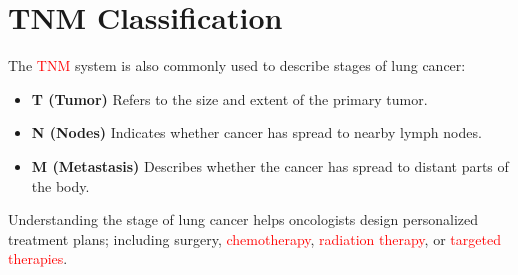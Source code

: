 \section{TNM Classification} 
The \textcolor{red}{TNM} system \cite{rami2024international} is also commonly used to describe stages of lung cancer:
\begin{remark}
\begin{itemize}
    \item \textbf{T (Tumor)}  Refers to the size and extent of the primary tumor.
    \item \textbf{N (Nodes)} Indicates whether cancer has spread to nearby lymph nodes.
    \item \textbf{M (Metastasis)} Describes whether the cancer has spread to distant parts of the body.
\end{itemize}
\end{remark}

Understanding the stage of lung cancer helps oncologists design personalized treatment plans; including surgery, \textcolor{red}{chemotherapy}, \textcolor{red}{radiation therapy}, or \textcolor{red}{targeted therapies}.
